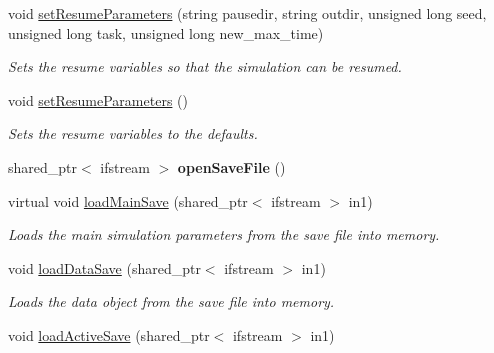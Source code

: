 \begin{DoxyCompactItemize}
void \hyperlink{class_tree_ac545d844141db977920fc9fd76ce9dbb}{set\+Resume\+Parameters} (string pausedir, string outdir, unsigned long seed, unsigned long task, unsigned long new\+\_\+max\+\_\+time)
\begin{DoxyCompactList}\small\item\em Sets the resume variables so that the simulation can be resumed. \end{DoxyCompactList}\item 
void \hyperlink{class_tree_aeade4bccb8394937a53bc4fbcf2b4300}{set\+Resume\+Parameters} ()\hypertarget{class_tree_aeade4bccb8394937a53bc4fbcf2b4300}{}\label{class_tree_aeade4bccb8394937a53bc4fbcf2b4300}

\begin{DoxyCompactList}\small\item\em Sets the resume variables to the defaults. \end{DoxyCompactList}\item 
shared\+\_\+ptr$<$ ifstream $>$ {\bfseries open\+Save\+File} ()\hypertarget{class_tree_acc6cbb7b0ac50a003a5e64ec3e37e3c0}{}\label{class_tree_acc6cbb7b0ac50a003a5e64ec3e37e3c0}

\item 
virtual void \hyperlink{class_tree_a7f40faa0cd2c61d9acfa0915bdeecffe}{load\+Main\+Save} (shared\+\_\+ptr$<$ ifstream $>$ in1)\hypertarget{class_tree_a7f40faa0cd2c61d9acfa0915bdeecffe}{}\label{class_tree_a7f40faa0cd2c61d9acfa0915bdeecffe}

\begin{DoxyCompactList}\small\item\em Loads the main simulation parameters from the save file into memory. \end{DoxyCompactList}\item 
void \hyperlink{class_tree_a65e6b9229e919776512518ebd5f91660}{load\+Data\+Save} (shared\+\_\+ptr$<$ ifstream $>$ in1)\hypertarget{class_tree_a65e6b9229e919776512518ebd5f91660}{}\label{class_tree_a65e6b9229e919776512518ebd5f91660}

\begin{DoxyCompactList}\small\item\em Loads the data object from the save file into memory. \end{DoxyCompactList}\item 
void \hyperlink{class_tree_adb4f5a02e428b1c0652f30e8aac3ea7f}{load\+Active\+Save} (shared\+\_\+ptr$<$ ifstream $>$ in1)\hypertarget{class_tree_adb4f5a02e428b1c0652f30e8aac3ea7f}{}\label{class_tree_adb4f5a02e428b1c0652f30e8aac3ea7f}


\end{DoxyCompactItemize}
